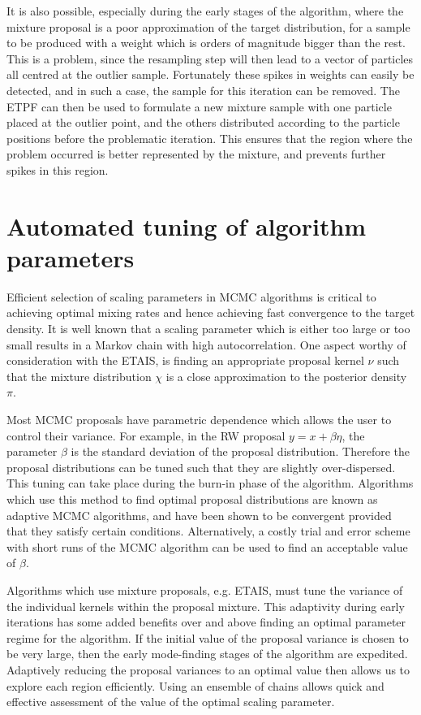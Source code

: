 \documentclass[final]{siamltex}
\begin{document}
It is also possible, especially during the early stages of the
algorithm, where the mixture proposal is a poor approximation of the
target distribution, for a sample to be produced with a weight which
is orders of magnitude bigger than the rest. This is a problem, since
the resampling step will then lead to a vector of particles all
centred at the outlier sample. Fortunately these spikes in weights can
easily be detected, and in such a case, the sample for this iteration
can be removed. The ETPF can then be used to formulate a new mixture
sample with one particle placed at the outlier point, and the others
distributed according to the particle positions before the problematic
iteration. This ensures that the region where the problem occurred is
better represented by the mixture, and prevents further spikes in this region.


\section{Automated tuning of algorithm parameters}\label{Sec:adapt}

Efficient selection of scaling parameters in MCMC algorithms is
critical to achieving optimal mixing rates and hence achieving fast
convergence to the target density. It is well known that a scaling
parameter which is either too large or too small results in a Markov
chain with high autocorrelation. One aspect worthy of consideration
with the ETAIS, is finding an appropriate proposal kernel $\nu$ such
that the mixture distribution $\chi$ is a close approximation to the
posterior density $\pi$.

Most MCMC proposals have parametric dependence which
allows the user to control their variance. For example, in the RW
proposal $y = x + \beta \eta$, the parameter $\beta$ is the standard deviation
of the proposal distribution. Therefore the proposal distributions can
be tuned such that they are slightly over-dispersed. This tuning
can take place during the burn-in phase of the algorithm. Algorithms
which use this method to find optimal proposal distributions are known
as adaptive MCMC algorithms, and have been shown to be convergent
provided that they satisfy certain
conditions\cite{roberts2007coupling,roberts2009examples}.
Alternatively, a costly trial and error scheme with short runs of the
MCMC algorithm can be used to find an acceptable value of $\beta$.

Algorithms which use mixture proposals, e.g. ETAIS, must tune the
variance of the individual kernels within the proposal mixture. This
adaptivity during early iterations has some added benefits over and above
finding an optimal parameter regime for the algorithm. If the initial
value of the proposal variance is chosen to be very large, then the early
mode-finding stages of the algorithm are expedited. Adaptively
reducing the proposal variances to an optimal value then allows us to
explore each region efficiently. Using an ensemble of chains allows
quick and effective assessment of the value of the optimal scaling
parameter.
\end{document}
